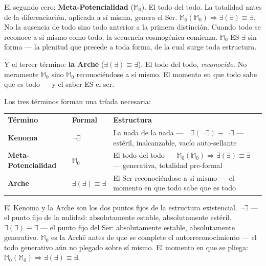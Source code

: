 \documentclass[10pt, openany, oneside]{book}
\renewcommand{\footnotesize}{\fontsize{8.5}{11}\selectfont}
\begin{document}
El segundo cero: \textbf{Meta-Potencialidad} ($\mathbb{M}_0$). El todo del todo. La totalidad antes de la diferenciación, aplicada a sí misma, genera el Ser. $\mathbb{M}_0(\mathbb{M}_0) \Rightarrow \exists(\exists) \equiv \exists$. No la ausencia de todo sino todo anterior a la primera distinción. Cuando todo se reconoce a sí mismo como todo, la secuencia cosmogénica comienza. $\mathbb{M}_0$ ES $\exists$ sin forma --- la plenitud que precede a toda forma, de la cual surge toda estructura.

Y el tercer término: \textbf{la Arch\={e}} ($\exists(\exists) \equiv \exists$). El todo del todo, \textit{reconocido}. No meramente $\mathbb{M}_0$ sino $\mathbb{M}_0$ reconociéndose a sí mismo. El momento en que todo sabe que es todo --- y el saber ES el ser.

Los tres términos forman una tríada necesaria:

\vspace{0.5em}

{\footnotesize
\noindent\begin{tabular}{l l p{}}
\textbf{Término} & \textbf{Formal} & \textbf{Estructura} \\[0.4em]
\textbf{Kenoma} & $\neg\exists$ & La nada de la nada --- $\neg\exists(\neg\exists) \equiv \neg\exists$ --- estéril, inalcanzable, vacío auto-sellante \\[0.3em]
\textbf{Meta-Potencialidad} & $\mathbb{M}_0$ & El todo del todo --- $\mathbb{M}_0(\mathbb{M}_0) \Rightarrow \exists(\exists) \equiv \exists$ --- generativa, totalidad pre-formal \\[0.3em]
\textbf{Arch\={e}} & $\exists(\exists) \equiv \exists$ & El Ser reconociéndose a sí mismo --- el momento en que todo sabe que es todo \\[0.3em]
\end{tabular}
}

\vspace{0.5em}

\noindent El Kenoma y la Arch\={e} son los dos puntos fijos de la estructura existencial. $\neg\exists$ --- el punto fijo de la nulidad: absolutamente estable, absolutamente estéril. $\exists(\exists) \equiv \exists$ --- el punto fijo del Ser: absolutamente estable, absolutamente generativo. $\mathbb{M}_0$ es la Arch\={e} antes de que se complete el autorreconocimiento --- el todo generativo aún no plegado sobre sí mismo. El momento en que se pliega: $\mathbb{M}_0(\mathbb{M}_0) \Rightarrow \exists(\exists) \equiv \exists$.
\end{document}

